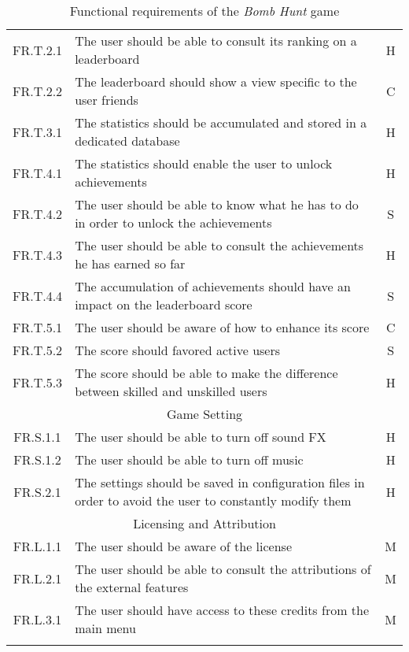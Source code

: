 \begin{center}
\begin{longtable}[c]{cp{12cm}c}
      FR.T.2.1 & The user should be able to consult its ranking on a leaderboard & H \\
      FR.T.2.2 & The leaderboard should show a view specific to the user friends & C \\

      FR.T.3.1 & The statistics should be accumulated and stored in a dedicated database & H \\

      FR.T.4.1 & The statistics should enable the user to unlock achievements & H \\
      FR.T.4.2 & The user should be able to know what he has to do in order to unlock the achievements & S \\
      FR.T.4.3 & The user should be able to consult the achievements he has earned so far & H \\
      FR.T.4.4 & The accumulation of achievements should have an impact on the leaderboard score & S \\

      FR.T.5.1 & The user should be aware of how to enhance its score & C \\
      FR.T.5.2 & The score should favored active users & S \\
      FR.T.5.3 & The score should be able to make the difference between skilled and unskilled users & H \\

    \midrule
      \multicolumn{3}{c}{Game Setting} \\
    \midrule
      FR.S.1.1 & The user should be able to turn off sound FX & H \\
      FR.S.1.2 & The user should be able to turn off music & H \\
      FR.S.2.1 & The settings should be saved in configuration files in order to avoid the user to constantly modify them & H \\

    \midrule
      \multicolumn{3}{c}{Licensing and Attribution} \\
    \midrule
      FR.L.1.1 & The user should be aware of the license & M \\
      FR.L.2.1 & The user should be able to consult the attributions of the external features & M \\
      FR.L.3.1 & The user should have access to these credits from the main menu & M \\
    \bottomrule
    \caption{Functional requirements of the \textit{Bomb Hunt} game}
    \label{tab:funcReq}
  \end{longtable}
\end{center}

